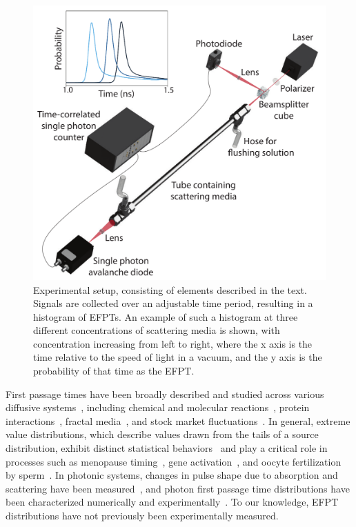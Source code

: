 \begin{figure}[h]
\begin{center}
\includegraphics[width=0.8\columnwidth]{Figures/exp-setup-3.pdf}
\caption{\label{fig:setup}  Experimental setup, consisting of elements described in the text. Signals are collected over an adjustable time period, resulting in a histogram of EFPTs. An example of such a histogram at three different concentrations of scattering media is shown, with concentration increasing from left to right, where the x axis is the time relative to the speed of light in a vacuum, and the y axis is the probability of that time as the EFPT.}
\end{center}
\end{figure}

First passage times have been broadly described and studied across various diffusive systems~\cite{redner_guide_2001,weiss_applications_2002,godec_first_2016,noskowicz_average_1988}, including chemical and molecular reactions~\cite{redner_guide_2001,grebenkov_molecular_2021}, protein interactions~\cite{polizzi_mean_2016}, fractal media~\cite{chun_heterogeneous_2023}, and stock market fluctuations~\cite{barney_first-passage-time_2017,zsurkis_first_2024}. In general, extreme value distributions, which describe values drawn from the tails of a source distribution, exhibit distinct statistical behaviors~\cite{lawley_distribution_2020,lawley_universal_2020} and play a critical role in processes such as menopause timing~\cite{lawley_slowest_2023}, gene activation~\cite{schuss_redundancy_2019}, and oocyte fertilization by sperm~\cite{meerson_mortality_2015,schuss_redundancy_2019}.  In photonic systems, changes in pulse shape due to absorption and scattering have been measured~\cite{lee_using_2007,madsen_experimental_1992,ishimaru_diffusion_1978,yoo_time-resolved_1990,yoo_when_1990,zhang_wave_2002,calba_ultrashort_2008}, and photon first passage time distributions have been characterized numerically and experimentally~\cite{rossetto_isotropic_2022,long_particle_2001,weiss_applications_2002,zeller_light_2020}. To our knowledge, EFPT distributions have not previously been experimentally measured.


